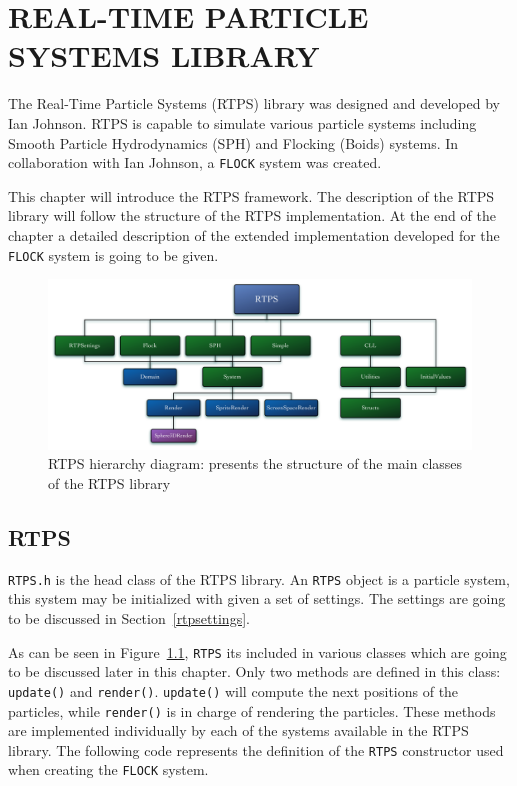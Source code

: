 \chapter{REAL-TIME PARTICLE SYSTEMS LIBRARY}\label{RTPSchapter}

The Real-Time Particle Systems (RTPS) library was designed and developed by Ian Johnson\cite{ianPaper}. RTPS is capable to simulate various particle systems including Smooth Particle Hydrodynamics (SPH) and Flocking (Boids) systems. In collaboration with Ian Johnson, a \texttt{FLOCK} system was created.

This chapter will introduce the RTPS framework. The description of the RTPS library will follow the structure of the RTPS implementation. At the end of the chapter a detailed description of the extended implementation developed for the \texttt{FLOCK} system is going to be given. 

\begin{figure}[htbp]
\begin{center}
\includegraphics[scale=0.30]{figures/RTPSdiagram.pdf}
\caption{RTPS hierarchy diagram: presents the structure of the main classes of the RTPS library}
\label{RTPSdiagram}
\end{center}
\end{figure}

\section{RTPS}\label{rtpssection}
\texttt{RTPS.h} is the head class of the RTPS library. An \texttt{RTPS} object is a particle system, this system may be initialized with given a set of settings. The settings are going to be discussed in Section~\ref{rtpsettings}. 

As can be seen in Figure~\ref{RTPSdiagram}, \texttt{RTPS} its included in various classes which are going to be discussed later in this chapter. Only two methods are defined in this class: \texttt{update()} and \texttt{render()}. \texttt{update()} will compute the next positions of the particles, while \texttt{render()} is in charge of rendering the particles. These methods are implemented individually by each of the systems available in the RTPS library. The following code represents the definition of the \texttt{RTPS} constructor used when creating the \texttt{FLOCK} system.

